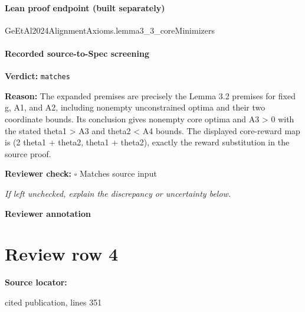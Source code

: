 \documentclass[10pt]{article}
\newcommand{\reviewerbox}{%
  \par\noindent\fbox{\parbox{0.96\linewidth}{\rule{0pt}{0.38in}}}\par
}
\newcommand{\reviewmatch}[1]{%
  \par\noindent\textbf{Reviewer check:} $\square$\; #1\par
  \noindent\emph{If left unchecked, explain the discrepancy or uncertainty below.}\par
}
\begin{document}
\paragraph{Lean proof endpoint (built separately)}\begin{ReviewVerbatim}
GeEtAl2024AlignmentAxioms.lemma3_3_coreMinimizers
\end{ReviewVerbatim}

\paragraph{Recorded source-to-Spec screening}
\textbf{Verdict:} \texttt{matches}
\\
{\raggedright
\textbf{Reason:} The expanded premises are precisely the Lemma 3.\allowbreak{}2 premises for fixed g, A1, and A2, including nonempty unconstrained optima and their two coordinate bounds.\allowbreak{}  Its conclusion gives nonempty core optima and A3 > 0 with the stated theta1 > A3 and theta2 < A4 bounds.\allowbreak{}  The displayed core-\allowbreak{}reward map is (2 theta1 + theta2, theta1 + theta2), exactly the reward substitution in the source proof.\allowbreak{}
\par}
\reviewmatch{Matches source input}
\noindent\textbf{Reviewer annotation}\par
\reviewerbox
\clearpage
\hypertarget{source-claim-265a179612823be4}{}
\section*{Review row 4}
\textbf{Source locator:} {\footnotesize\raggedright cited publication, lines 351\par}
\end{document}
